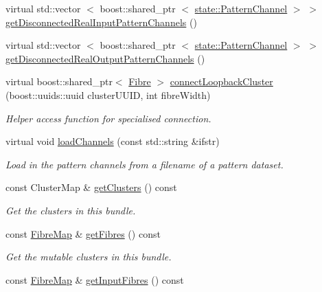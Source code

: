 \begin{DoxyCompactItemize}
\item 
virtual std\-::vector\*
$<$ boost\-::shared\-\_\-ptr\*
$<$ \hyperlink{classcryomesh_1_1state_1_1PatternChannel}{state\-::\-Pattern\-Channel} $>$ $>$ \hyperlink{classcryomesh_1_1structures_1_1Bundle_a6f400ee92f49fed82ca9ef5b48cde285}{get\-Disconnected\-Real\-Input\-Pattern\-Channels} ()
\item 
virtual std\-::vector\*
$<$ boost\-::shared\-\_\-ptr\*
$<$ \hyperlink{classcryomesh_1_1state_1_1PatternChannel}{state\-::\-Pattern\-Channel} $>$ $>$ \hyperlink{classcryomesh_1_1structures_1_1Bundle_a5ce1e31c814ef83026c0dbda5ba04a24}{get\-Disconnected\-Real\-Output\-Pattern\-Channels} ()
\item 
virtual boost\-::shared\-\_\-ptr$<$ \hyperlink{classcryomesh_1_1structures_1_1Fibre}{\-Fibre} $>$ \hyperlink{classcryomesh_1_1structures_1_1Bundle_a0aa4399de46de8ee753e3959fca2fb62}{connect\-Loopback\-Cluster} (boost\-::uuids\-::uuid cluster\-U\-U\-I\-D, int fibre\-Width)
\begin{DoxyCompactList}\small\item\em \-Helper access function for specialised connection. \end{DoxyCompactList}\item 
virtual void \hyperlink{classcryomesh_1_1structures_1_1Bundle_ad60a89acf924c5aebae3a5f816f358db}{load\-Channels} (const std\-::string \&ifstr)
\begin{DoxyCompactList}\small\item\em \-Load in the pattern channels from a filename of a pattern dataset. \end{DoxyCompactList}\item 
const \-Cluster\-Map \& \hyperlink{classcryomesh_1_1structures_1_1Bundle_a181e1f2aaa3b529b8609917d5b5315e0}{get\-Clusters} () const 
\begin{DoxyCompactList}\small\item\em \-Get the clusters in this bundle. \end{DoxyCompactList}\item 
const \hyperlink{classcryomesh_1_1structures_1_1FibreMap}{\-Fibre\-Map} \& \hyperlink{classcryomesh_1_1structures_1_1Bundle_a8f112d3b34f84511781879217b15c6d2}{get\-Fibres} () const 
\begin{DoxyCompactList}\small\item\em \-Get the mutable clusters in this bundle. \end{DoxyCompactList}\item 
const \hyperlink{classcryomesh_1_1structures_1_1FibreMap}{\-Fibre\-Map} \& \hyperlink{classcryomesh_1_1structures_1_1Bundle_a5c6496d00065462122a71c812fa7a4e8}{get\-Input\-Fibres} () const 

\end{DoxyCompactItemize}
